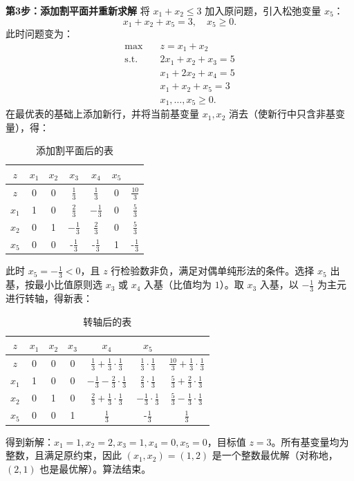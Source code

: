 \documentclass[12pt]{article}
\theoremstyle{plain}
\theoremstyle{definition}
\newcommand{\st}{\mathrel{\text{s.t.}}}
\begin{document}
\textbf{第3步：添加割平面并重新求解}  
将 $x_1 + x_2 \le 3$ 加入原问题，引入松弛变量 $x_5$：
\[ x_1 + x_2 + x_5 = 3, \quad x_5 \ge 0. \]
此时问题变为：
\begin{align*}
    \max \quad & z = x_1 + x_2 \\
    \st \quad & 2x_1 + x_2 + x_3 = 5 \\
    & x_1 + 2x_2 + x_4 = 5 \\
    & x_1 + x_2 + x_5 = 3 \\
    & x_1, \dots, x_5 \ge 0.
\end{align*}
在最优表的基础上添加新行，并将当前基变量 $x_1, x_2$ 消去（使新行中只含非基变量），得：
\begin{table}[!htbp]
    \caption{添加割平面后的表}
    \centering
    \begin{tabular}{c|ccccc|c}
        \hline
        $z$ & $x_1$ & $x_2$ & $x_3$ & $x_4$ & $x_5$ & \\ 
        \hline
        $z$ & 0 & 0 & $\frac{1}{3}$ & $\frac{1}{3}$ & 0 & $\frac{10}{3}$ \\
        $x_1$ & 1 & 0 & $\frac{2}{3}$ & $-\frac{1}{3}$ & 0 & $\frac{5}{3}$ \\
        $x_2$ & 0 & 1 & $-\frac{1}{3}$ & $\frac{2}{3}$ & 0 & $\frac{5}{3}$ \\
        $x_5$ & 0 & 0 & -$\frac{1}{3}$ & -$\frac{1}{3}$ & 1 & -$\frac{1}{3}$ \\
        \hline
    \end{tabular}
\end{table}
此时 $x_5 = -\frac{1}{3} < 0$，且 $z$ 行检验数非负，满足对偶单纯形法的条件。选择 $x_5$ 出基，按最小比值原则选 $x_3$ 或 $x_4$ 入基（比值均为 $1$）。取 $x_3$ 入基，以 $-\frac{1}{3}$ 为主元进行转轴，得新表：
\begin{table}[!htbp]
    \caption{转轴后的表}
    \centering
    \begin{tabular}{c|ccccc|c}
        \hline
        $z$ & $x_1$ & $x_2$ & $x_3$ & $x_4$ & $x_5$ & \\ 
        \hline
        $z$ & 0 & 0 & 0 & $\frac{1}{3} + \frac{1}{3} \cdot \frac{1}{3}$ & $\frac{1}{3} \cdot \frac{1}{3}$ & $\frac{10}{3} + \frac{1}{3} \cdot \frac{1}{3}$ \\
        $x_1$ & 1 & 0 & 0 & $-\frac{1}{3} - \frac{2}{3} \cdot \frac{1}{3}$ & $\frac{2}{3} \cdot \frac{1}{3}$ & $\frac{5}{3} + \frac{2}{3} \cdot \frac{1}{3}$ \\
        $x_2$ & 0 & 1 & 0 & $\frac{2}{3} + \frac{1}{3} \cdot \frac{1}{3}$ & $-\frac{1}{3} \cdot \frac{1}{3}$ & $\frac{5}{3} - \frac{1}{3} \cdot \frac{1}{3}$ \\
        $x_5$ & 0 & 0 & 1 & $\frac{1}{3}$ & -$\frac{1}{3}$ & $\frac{1}{3}$ \\
        \hline
    \end{tabular}
\end{table}
得到新解：$x_1 = 1, x_2 = 2, x_3 = 1, x_4 = 0, x_5 = 0$，目标值 $z = 3$。所有基变量均为整数，且满足原约束，因此 $(x_1, x_2) = (1, 2)$ 是一个整数最优解（对称地，$(2,1)$ 也是最优解）。算法结束。
\end{document}
